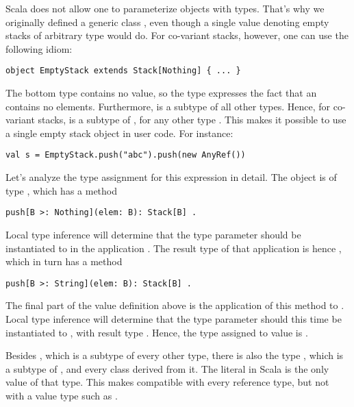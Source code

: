 Scala does not allow one to parameterize objects with types. That's
why we originally defined a generic class , even
though a single value denoting empty stacks of arbitrary type would
do. For co-variant stacks, however, one can use the following idiom:
\begin{lstlisting}
object EmptyStack extends Stack[Nothing] { ... }
\end{lstlisting}
The bottom type  contains no value, so the type
 expresses the fact that an 
contains no elements. Furthermore,  is a subtype of all
other types. Hence, for co-variant stacks,  is a
subtype of , for any other type . This makes it
possible to use a single empty stack object in user code. For
instance:
\begin{lstlisting}
val s = EmptyStack.push("abc").push(new AnyRef())
\end{lstlisting}
Let's analyze the type assignment for this expression in detail.  The
 object is of type , which has a
method
\begin{lstlisting}
push[B >: Nothing](elem: B): Stack[B] .
\end{lstlisting}
Local type inference will determine that the type parameter 
should be instantiated to  in the application 
. The result type of that application is hence
, which in turn has a method
\begin{lstlisting}
push[B >: String](elem: B): Stack[B] .
\end{lstlisting}
The final part of the value definition above is the application of
this method to . Local type inference will
determine that the type parameter  should this time be
instantiated to , with result type .
Hence, the type assigned to value  is .

Besides , which is a subtype of every other type, there
is also the type , which is a subtype of
, and every class derived from it. The 
literal in Scala is the only value of that type. This makes
 compatible with every reference type, but not with a value
type such as .

